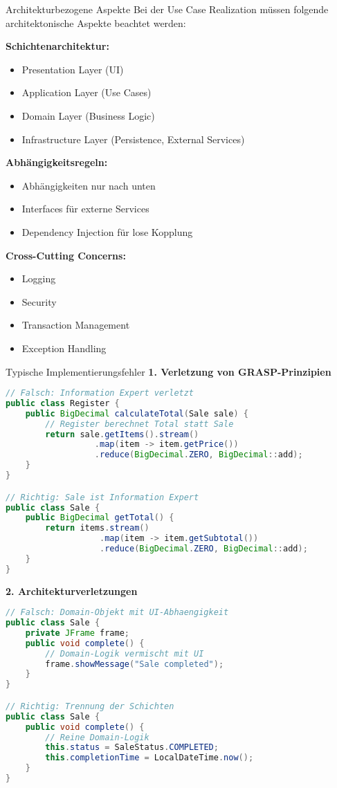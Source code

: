 \begin{concept}{Architekturbezogene Aspekte}
Bei der Use Case Realization müssen folgende architektonische Aspekte beachtet werden:

\textbf{Schichtenarchitektur:}
\begin{itemize}
    \item Presentation Layer (UI)
    \item Application Layer (Use Cases)
    \item Domain Layer (Business Logic)
    \item Infrastructure Layer (Persistence, External Services)
\end{itemize}

\textbf{Abhängigkeitsregeln:}
\begin{itemize}
    \item Abhängigkeiten nur nach unten
    \item Interfaces für externe Services
    \item Dependency Injection für lose Kopplung
\end{itemize}

\textbf{Cross-Cutting Concerns:}
\begin{itemize}
    \item Logging
    \item Security
    \item Transaction Management
    \item Exception Handling
\end{itemize}
\end{concept}

\begin{example2}{Typische Implementierungsfehler}
\textbf{1. Verletzung von GRASP-Prinzipien}
\begin{lstlisting}[language=Java, style=basesmol]
// Falsch: Information Expert verletzt
public class Register {
    public BigDecimal calculateTotal(Sale sale) {
        // Register berechnet Total statt Sale
        return sale.getItems().stream()
                  .map(item -> item.getPrice())
                  .reduce(BigDecimal.ZERO, BigDecimal::add);
    }
}

// Richtig: Sale ist Information Expert
public class Sale {
    public BigDecimal getTotal() {
        return items.stream()
                   .map(item -> item.getSubtotal())
                   .reduce(BigDecimal.ZERO, BigDecimal::add);
    }
}
\end{lstlisting}

\textbf{2. Architekturverletzungen}
\begin{lstlisting}[language=Java, style=basesmol]
// Falsch: Domain-Objekt mit UI-Abhaengigkeit
public class Sale {
    private JFrame frame;
    public void complete() {
        // Domain-Logik vermischt mit UI
        frame.showMessage("Sale completed");
    }
}

// Richtig: Trennung der Schichten
public class Sale {
    public void complete() {
        // Reine Domain-Logik
        this.status = SaleStatus.COMPLETED;
        this.completionTime = LocalDateTime.now();
    }
}
\end{lstlisting}
\end{example2}

